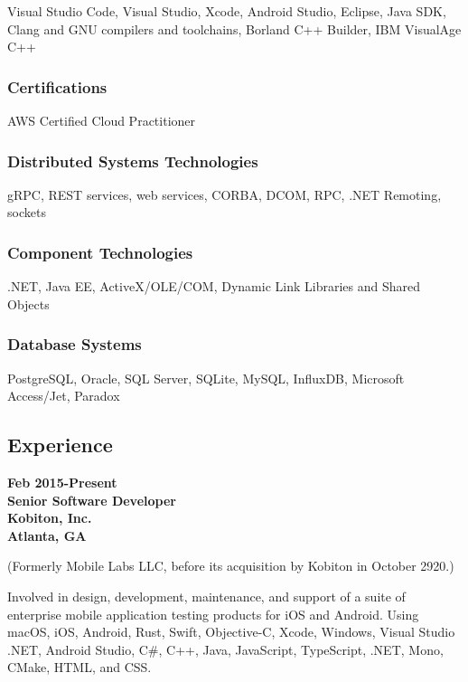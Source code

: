 Visual Studio Code, Visual Studio, Xcode, Android Studio, Eclipse, Java
SDK, Clang and GNU compilers and toolchains, Borland C++ Builder, IBM
VisualAge C++

\hypertarget{certifications}{%
\subsubsection{Certifications}\label{certifications}}

AWS Certified Cloud Practitioner

\hypertarget{distributed-systems-technologies}{%
\subsubsection{Distributed Systems
Technologies}\label{distributed-systems-technologies}}

gRPC, REST services, web services, CORBA, DCOM, RPC, .NET Remoting,
sockets

\hypertarget{component-technologies}{%
\subsubsection{Component Technologies}\label{component-technologies}}

.NET, Java EE, ActiveX/OLE/COM, Dynamic Link Libraries and Shared
Objects

\hypertarget{database-systems}{%
\subsubsection{Database Systems}\label{database-systems}}

PostgreSQL, Oracle, SQL Server, SQLite, MySQL, InfluxDB, Microsoft
Access/Jet, Paradox

\hypertarget{experience}{%
\subsection{Experience}\label{experience}}

\textbf{Feb 2015-Present\\
Senior Software Developer\\
Kobiton, Inc.\\
Atlanta, GA}

(Formerly Mobile Labs LLC, before its acquisition by Kobiton in October
2920.)

Involved in design, development, maintenance, and support of a suite of
enterprise mobile application testing products for iOS and Android.
Using macOS, iOS, Android, Rust, Swift, Objective-C, Xcode, Windows,
Visual Studio .NET, Android Studio, C\#, C++, Java, JavaScript,
TypeScript, .NET, Mono, CMake, HTML, and CSS.

